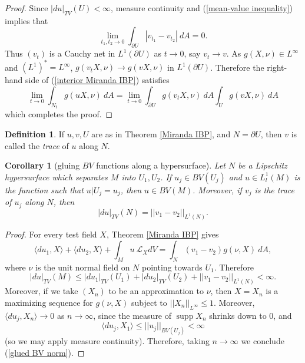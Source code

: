 \documentclass[reqno,12pt,letterpaper]{amsart}
\DeclareMathOperator{\supp}{supp}
\newcommand{\dfn}[1]{\emph{#1}\index{#1}}
\newtheorem{corollary}[theorem]{Corollary}
\theoremstyle{definition}
\newtheorem{definition}[theorem]{Definition}
\numberwithin{equation}{section}
\begin{document}
\begin{proof}
Since $|du|_{TV}(U) < \infty$, measure continuity and (\ref{mean-value inequality}) implies that
$$\lim_{t_1, t_2 \to 0} \int_{\partial U} |v_{t_1} - v_{t_2}| ~dA = 0.$$
Thus $(v_t)$ is a Cauchy net in $L^1(\partial U)$ as $t \to 0$, say $v_t \to v$.
As $g(X, \nu) \in L^\infty$ and $(L^1)^* = L^\infty$, $g(v_tX, \nu) \to g(vX, \nu)$ in $L^1(\partial U)$.
Therefore the right-hand side of (\ref{interior Miranda IBP}) satisfies
$$\lim_{t \to 0} \int_{N_t} g(uX, \nu) ~dA = \lim_{t \to 0} \int_{\partial U} g(v_tX, \nu) ~dA \int_U g(vX, \nu) ~dA$$
which completes the proof.
\end{proof}

\begin{definition}
If $u,v,U$ are as in Theorem \ref{Miranda IBP}, and $N = \partial U$, then $v$ is called the \dfn{trace} of $u$ along $N$.
\end{definition}

\begin{corollary}[gluing $BV$ functions along a hypersurface]\label{gluing}
Let $N$ be a Lipschitz hypersurface which separates $M$ into $U_1,U_2$.
If $u_j \in BV(U_j)$ and $u \in L^1_l(M)$ is the function such that $u|U_j = u_j$, then $u \in BV(M)$.
Moreover, if $v_j$ is the trace of $u_j$ along $N$, then
\begin{equation}
\label{glued BV norm}
|du|_{TV}(N) = ||v_1 - v_2||_{L^1(N)}.
\end{equation}
\end{corollary}
\begin{proof}
For every test field $X$, Theorem \ref{Miranda IBP} gives
$$\langle du_1, X\rangle + \langle du_2, X\rangle + \int_M u~\mathcal L_XdV = \int_N (v_1 - v_2) g(\nu, X) ~dA,$$
where $\nu$ is the unit normal field on $N$ pointing towards $U_1$.
Therefore
$$|du|_{TV}(M) \leq |du_1|_{TV}(U_1) + |du_2|_{TV}(U_2) + ||v_1 - v_2||_{L^1(N)} < \infty.$$
Moreover, if we take $(X_n)$ to be an approximation to $\nu$, then $X = X_n$ is a maximizing sequence for $g(\nu, X)$ subject to $||X_n||_{L^\infty} \leq 1$.
Moreover, $\langle du_j, X_n\rangle \to 0$ as $n \to \infty$, since the measure of $\supp X_n$ shrinks down to $0$, and
$$\langle du_j, X_1\rangle \leq ||u_j||_{BV(U_j)} < \infty$$
(so we may apply measure continuity). Therefore, taking $n \to \infty$ we conclude (\ref{glued BV norm}).
\end{proof}

\end{document}
